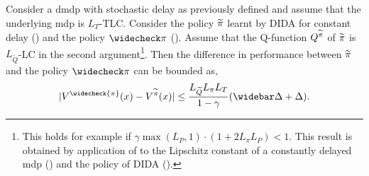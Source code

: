 \begin{thm}
\label{thm:stoch_mdp_dida_bound}
    Consider a \gls{dmdp} with stochastic delay as previously defined and assume that the underlying \gls{mdp} is $L_T$-TLC.
    Consider the policy ${\widetilde{\pi}}$ learnt by DIDA for constant delay () and the policy $\widecheck\pi$ ().
    Assume that the Q-function $Q^{\widetilde{\pi}}$ of ${\widetilde{\pi}}$ is $L_{\widetilde Q}$-LC in the second argument\footnote{This holds for example if $\gamma\max(L_P,1)\cdot(1+2L_\pi L_P)<1$. This result is obtained by application of \cite[Theorem~1]{rachelson2010locality} to the Lipschitz constant of a constantly delayed \gls{mdp} () and the policy of DIDA ().}. 
    Then the difference in performance between ${\widetilde{\pi}}$ and the policy $\widecheck\pi$ can be bounded as,
    \begin{align*}
        \lvert V^{\widecheck{\pi}}(x)- V^{\delayedpolicy}(x)\rvert \le \frac{L_{\widetilde Q} L_\pi L_T }{1-\gamma}(\widebar\delay+\delay).
    \end{align*}
\end{thm}
